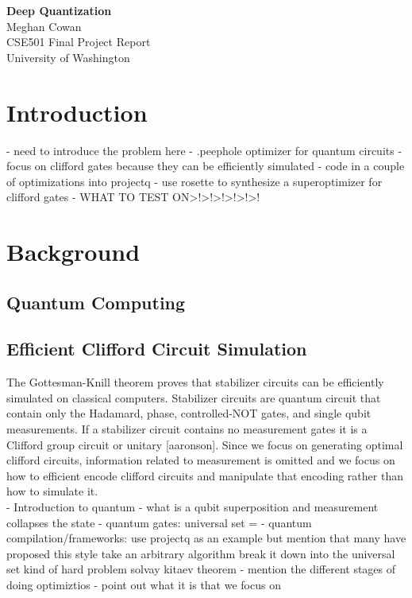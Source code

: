 \documentclass{article}
\begin{document}
\begin{centering}
\noindent
{\Large\textbf{Deep Quantization}} \\
Meghan Cowan\\
CSE501 Final Project Report \\
University of Washington \\
\vspace{3ex}
\end{centering}

\abstract{
}

\vspace{1ex}\noindent

\section{Introduction}
 - need to introduce the problem here
 - .peephole optimizer for quantum circuits
 - focus on clifford gates because they can be efficiently simulated
 - code in a couple of optimizations into projectq
 - use rosette to synthesize a superoptimizer for clifford gates
 - WHAT TO TEST ON>!>!>!>!>!>!

\section{Background}
\subsection{Quantum Computing}
\subsection{Efficient Clifford Circuit Simulation}
The Gottesman-Knill theorem proves that stabilizer circuits can be efficiently simulated on classical computers. Stabilizer circuits are quantum circuit that contain only the Hadamard, phase, controlled-NOT gates, and single qubit measurements. If a stabilizer circuit contains no measurement gates it is a Clifford group circuit or unitary [aaronson]. Since we focus on generating optimal clifford circuits, information related to measurement is omitted and we focus on how to efficient encode clifford circuits and manipulate that encoding rather than how to simulate it.\\

- Introduction to quantum
  - what is a qubit superposition and measurement collapses the state
  - quantum gates: universal set  = {}
  - quantum compilation/frameworks: use projectq as an example but mention that many have proposed this style
    take an arbitrary algorithm break it down into the universal set
    kind of hard problem solvay kitaev theorem
  - mention the different stages of doing optimiztios
  - point out what it is that we focus on 
\end{document}
